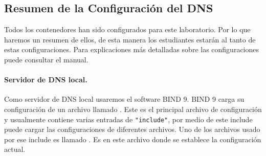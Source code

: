 

\subsection{Resumen de la Configuración del DNS} 

Todos los contenedores han sido configurados para este laboratorio.
Por lo que haremos un resumen de ellos, de esta manera los estudiantes estarán al tanto de estas configuraciones. Para explicaciones más detalladas sobre las configuraciones puede consultar el manual.



\paragraph{Servidor de DNS local.} 
Como servidor de DNS local usaremos el software BIND 9.
BIND 9 carga su configuración de un archivo llamado . Este es el principal archivo de configuración y usualmente contiene varias entradas de \texttt{"include"}, por medio de este include puede cargar las configuraciones de diferentes archivos. Uno de los archivos usado por ese include es llamado . Es en este archivo donde se establece la configuración actual.



